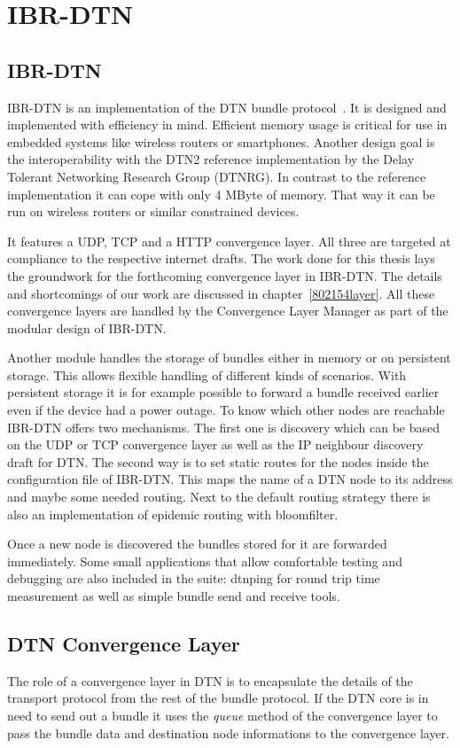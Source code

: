 \chapter{IBR-DTN}
\label{ibr-dtn}
\section{IBR-DTN}

IBR-DTN is an implementation of the DTN bundle protocol~\cite{RFC5050}. It is
designed and implemented with efficiency in mind. Efficient memory usage is critical
for use in embedded systems like wireless routers or smartphones. Another design
goal is the interoperability with the DTN2 reference implementation by the Delay
Tolerant Networking Research Group (DTNRG). In contrast to the reference
implementation it can cope with only 4 MByte of memory. That way it can be run
on wireless routers or similar constrained devices.

It features a UDP, TCP and a HTTP convergence layer. All three are targeted at
compliance to the respective internet drafts. The work done for this thesis lays
the groundwork for the forthcoming convergence layer in IBR-DTN. The details and
shortcomings of our work are discussed in chapter~\ref{802154layer}. All these
convergence layers are handled by the Convergence Layer Manager as part of the
modular design of IBR-DTN.

Another module handles the storage of bundles either in memory or on persistent
storage. This allows flexible handling of different kinds of scenarios. With
persistent storage it is for example possible to forward a bundle received earlier
even if the device had a power outage. To know which other nodes are reachable
IBR-DTN offers two mechanisms. The first one is discovery which can be based on
the UDP or TCP convergence layer as well as the IP neighbour discovery draft for
DTN. The second way is to set static routes for the nodes inside the
configuration file of IBR-DTN. This maps the name of a DTN node to its address
and maybe some needed routing. Next to the default routing strategy there is
also an implementation of epidemic routing with bloomfilter.

Once a new node is discovered the bundles stored for it are forwarded immediately.
Some small applications that allow comfortable testing and debugging are also
included in the suite: dtnping for round trip time measurement as well as simple
bundle send and receive tools.

\section{DTN Convergence Layer}
The role of a convergence layer in DTN is to encapsulate the details of the
transport protocol from the rest of the bundle protocol. If the DTN core is in
need to send out a bundle it uses the \emph{queue} method of the convergence
layer to pass the bundle data and destination node informations to the
convergence layer.

